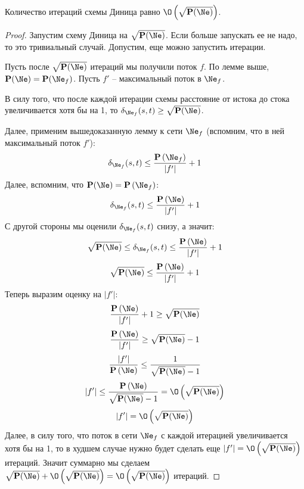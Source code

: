  Количество итераций схемы Диница равно $\O\left(\sqrt {\P(\Ne)}\right)$.
\begin{proof}
    
    Запустим схему Диница на $\sqrt {\P(\Ne)}$. Если больше запускать ее не надо, то это тривиальный случай. Допустим, еще можно запустить итерации. 
    
    Пусть после $\sqrt {\P(\Ne)}$ итераций мы получили поток $f$. По лемме выше, $\P(\Ne) = \P(\Ne_f)$. Пусть $f'$ -- максимальный поток в $\Ne_f$.
    
    В силу того, что после каждой итерации схемы расстояние от истока до стока увеличивается хотя бы на 1, то $\delta_{\Ne_f}(s, t) \geq \sqrt {\P(\Ne)}$.

    Далее, применим вышедоказанную лемму к сети $\Ne_f$ (вспомним, что в ней максимальный поток $f'$):
    \begin{equation*}
        \delta_{\Ne_f}(s, t) \leq \frac{\P\left(\Ne_f\right)}{|f'|} + 1
    \end{equation*}
    Далее, вспомним, что $\P(\Ne) = \P\left( \Ne_f \right)$:
    \begin{equation*}
        \delta_{\Ne_f}(s, t) \leq \frac{\P\left(\Ne\right)}{|f'|} + 1
    \end{equation*}
    С другой стороны мы оценили $\delta_{\Ne_f}(s, t)$ снизу, а значит:
    \begin{equation*}
        \sqrt {\P(\Ne)} \leq \delta_{\Ne_f}(s, t) \leq \frac{\P\left(\Ne\right)}{|f'|} + 1
    \end{equation*}
    \begin{equation*}
        \sqrt {\P(\Ne)} \leq \frac{\P\left(\Ne\right)}{|f'|} + 1
    \end{equation*}
    Теперь выразим оценку на $|f'|$:
    \begin{equation*}
        \frac{\P\left(\Ne\right)}{|f'|} + 1 \geq \sqrt {\P(\Ne)}
    \end{equation*}
    \begin{equation*}
        \frac{\P\left(\Ne\right)}{|f'|} \geq \sqrt {\P(\Ne)} - 1
    \end{equation*}
    \begin{equation*}
        \frac{|f'|}{\P\left(\Ne\right)} \leq \frac{1}{\sqrt {\P(\Ne)} - 1}
    \end{equation*}
    \begin{equation*}
        |f'| \leq \frac{\P\left(\Ne\right)}{\sqrt {\P(\Ne)} - 1} = \O\left(\sqrt {\P(\Ne)}\right)
    \end{equation*}
    \begin{equation*}
        |f'| = \O\left(\sqrt {\P(\Ne)}\right)
    \end{equation*}
    Далее, в силу того, что поток в сети $\Ne_f$ с каждой итерацией увеличивается хотя бы на 1, то в худшем случае нужно будет сделать еще $|f'| = \O\left(\sqrt {\P(\Ne)}\right)$ итераций.
    Значит суммарно мы сделаем $\sqrt {\P(\Ne)} + \O\left(\sqrt {\P(\Ne)}\right) = \O\left(\sqrt {\P(\Ne)}\right)$ итераций.

\end{proof}

